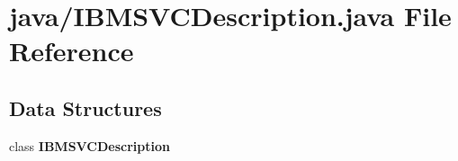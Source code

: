 \section{java/\-I\-B\-M\-S\-V\-C\-Description.java File Reference}
\label{IBMSVCDescription_8java}
\subsection*{Data Structures}
\begin{DoxyCompactItemize}
\item 
class {\bf I\-B\-M\-S\-V\-C\-Description}
\end{DoxyCompactItemize}
